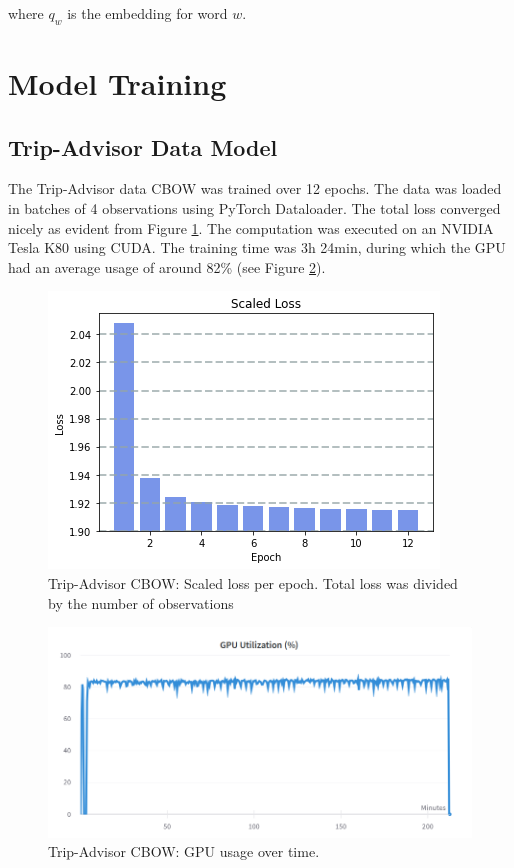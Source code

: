 \documentclass[fleqn,10pt]{SelfArx} %
\begin{document}
where $q_w$ is the embedding for word $w$.

\section{Model Training}

\subsection{Trip-Advisor Data Model}
The Trip-Advisor data CBOW was trained over 12 epochs. The data was loaded in batches of 4 observations using PyTorch Dataloader. The total loss converged nicely as evident from Figure \ref{fig:ta-loss}. The computation was executed on an NVIDIA Tesla K80 using CUDA. The training time was 3h 24min, during which the GPU had an average usage of around 82\% (see Figure \ref{figure:ta-gpuusage}).
\begin{figure}[ht]\centering
	\includegraphics[width=\linewidth]{Figures/Model1 Loss.png}
	\caption{Trip-Advisor CBOW: Scaled loss per epoch. Total loss was divided by the number of observations}
	\label{fig:ta-loss}
\end{figure}
\begin{figure}[ht]\centering
	\includegraphics[width=\linewidth]{Figures/GPU Utilization.png}
	\caption{Trip-Advisor CBOW: GPU usage over time.}
	\label{figure:ta-gpuusage}
\end{figure}
\end{document}
